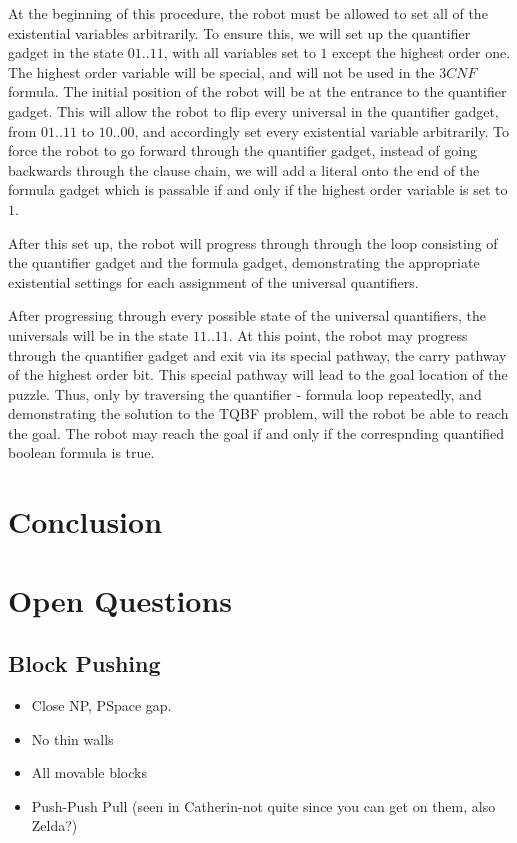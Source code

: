\documentclass[11pt]{article}
\begin{document}
At the beginning of this procedure, the robot must be allowed to set all of the existential variables arbitrarily.
To ensure this, we will set up the quantifier gadget in the state $01 .. 11$, with all variables set to $1$
except the highest order one.  The highest order variable will be special, and will not be used in the $3CNF$
formula. The initial position of the robot will be at the entrance to the quantifier gadget. This will allow
the robot to flip every universal in the quantifier gadget, from $01 .. 11$ to $10 .. 00$, and accordingly
set every existential variable arbitrarily. To force the robot to go forward through the quantifier gadget,
instead of going backwards through the clause chain, we will add a literal onto the end of the formula gadget
which is passable if and only if the highest order variable is set to $1$.

After this set up, the robot will progress through through the loop consisting of the quantifier gadget and the
formula gadget, demonstrating the appropriate existential settings for each assignment of the universal
quantifiers.

After progressing through every possible state of the universal quantifiers, the universals will be in the
state $11 .. 11$. At this point, the robot may progress through the quantifier gadget and exit via its special
pathway,
the carry pathway of the highest order bit. This special pathway will lead to the goal location of the puzzle.
Thus, only by traversing the quantifier - formula loop repeatedly, and demonstrating the solution to the TQBF
problem,
will the robot be able to reach the goal. The robot may reach the goal if and only if the correspnding quantified
boolean formula is true.
\section{Conclusion}

\section{Open Questions}

\subsection{Block Pushing}
\begin{itemize}
\item Close NP, PSpace gap.
\item No thin walls
\item All movable blocks
\item Push-Push Pull (seen in Catherin-not quite since you can get on them, also Zelda?)
\end{itemize}





{}
\end{document}
